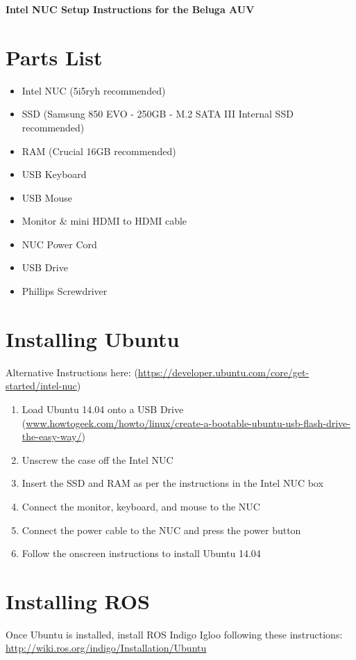 \documentclass{article}
\begin{document}
\begin{center}
\Large\bf Intel NUC Setup Instructions for the Beluga AUV
\end{center}

\section*{Parts List}
\begin{itemize}
    \item Intel NUC (5i5ryh recommended)
    \item SSD (Samsung 850 EVO - 250GB - M.2 SATA III Internal SSD recommended)
    \item RAM (Crucial 16GB recommended)
    \item USB Keyboard
    \item USB Mouse
    \item Monitor \& mini HDMI to HDMI cable
    \item NUC Power Cord
    \item USB Drive
    \item Phillips Screwdriver
\end{itemize}

\section*{Installing Ubuntu}
Alternative Instructions here: (\url{https://developer.ubuntu.com/core/get-started/intel-nuc})
\begin{enumerate}
    \item Load Ubuntu 14.04 onto a USB Drive \\ (\url{www.howtogeek.com/howto/linux/create-a-bootable-ubuntu-usb-flash-drive-the-easy-way/})
    \item Unscrew the case off the Intel NUC
    \item Insert the SSD and RAM as per the instructions in the Intel NUC box
    \item Connect the monitor, keyboard, and mouse to the NUC
    \item Connect the power cable to the NUC and press the power button
    \item Follow the onscreen instructions to install Ubuntu 14.04
\end{enumerate}

\section*{Installing ROS}
Once Ubuntu is installed, install ROS Indigo Igloo following these instructions: \url{http://wiki.ros.org/indigo/Installation/Ubuntu}
\end{document}
